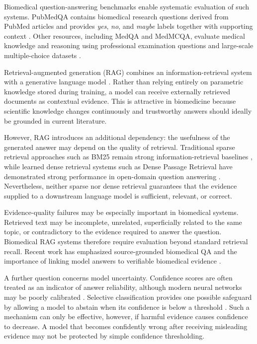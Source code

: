 \documentclass[conference]{IEEEtran}
\begin{document}
Biomedical question-answering benchmarks enable systematic evaluation of such systems. PubMedQA contains biomedical research questions derived from PubMed articles and provides \textit{yes}, \textit{no}, and \textit{maybe} labels together with supporting context \cite{jin2019pubmedqa}. Other resources, including MedQA and MedMCQA, evaluate medical knowledge and reasoning using professional examination questions and large-scale multiple-choice datasets \cite{jin2021medqa,pal2022medmcqa}.

Retrieval-augmented generation (RAG) combines an information-retrieval system with a generative language model \cite{lewis2020rag}. Rather than relying entirely on parametric knowledge stored during training, a model can receive externally retrieved documents as contextual evidence. This is attractive in biomedicine because scientific knowledge changes continuously and trustworthy answers should ideally be grounded in current literature.

However, RAG introduces an additional dependency: the usefulness of the generated answer may depend on the quality of retrieval. Traditional sparse retrieval approaches such as BM25 remain strong information-retrieval baselines \cite{robertson2009bm25}, while learned dense retrieval systems such as Dense Passage Retrieval have demonstrated strong performance in open-domain question answering \cite{karpukhin2020dpr}. Nevertheless, neither sparse nor dense retrieval guarantees that the evidence supplied to a downstream language model is sufficient, relevant, or correct.

Evidence-quality failures may be especially important in biomedical systems. Retrieved text may be incomplete, unrelated, superficially related to the same topic, or contradictory to the evidence required to answer the question. Biomedical RAG systems therefore require evaluation beyond standard retrieval recall. Recent work has emphasized source-grounded biomedical QA and the importance of linking model answers to verifiable biomedical evidence \cite{basaragin2024biomedicalrag}.

A further question concerns model uncertainty. Confidence scores are often treated as an indicator of answer reliability, although modern neural networks may be poorly calibrated \cite{guo2017calibration}. Selective classification provides one possible safeguard by allowing a model to abstain when its confidence is below a threshold \cite{geifman2017selective}. Such a mechanism can only be effective, however, if harmful evidence causes confidence to decrease. A model that becomes confidently wrong after receiving misleading evidence may not be protected by simple confidence thresholding.
\end{document}
